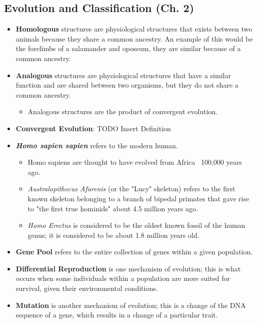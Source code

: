 \documentclass[10pt, landscape]{article}
\begin{document}
\begin{multicols}{2}
		\section{Evolution and Classification (Ch. 2)}
			\begin{itemize}
				\item \textbf{Homologous} structures are physiological structures that exists between two animals because they share a common ancestry. An example of this would be the forelimbs of a salamander and opossum, they are similar because of a common ancestry.
				\item \textbf{Analogous} structures are physiological structures that have a similar function and are shared between two organisms, but they do not share a common ancestry.
				\begin{itemize}
					\item Analogous structures are the product of convergent evolution.
				\end{itemize}
				\item \textbf{Convergent Evolution}: TODO Insert Definition %
				\item \textbf{\textit{Homo sapien sapien}} refers to the modern human.
				\begin{itemize}
					\item Homo sapiens are thought to have evolved from Africa ~100,000 years ago.
					\item \textit{Australopithecus Afarenis} (or the "Lucy" skeleton) refers to the first known skeleton belonging to a branch of bipedal primates that gave rise to "the first true hominids" about 4.5 million years ago.
					\item \textit{Homo Erectus} is considered to be the oldest known fossil of the human genus; it is considered to be about 1.8 million years old. 
				\end{itemize}
				\item \textbf{Gene Pool} refers to the entire collection of genes within a given population.
				\item \textbf{Differential Reproduction} is one mechanism of evolution; this is what occurs when some individuals within a population are more suited for survival, given their environmental conditions. 
				\item \textbf{Mutation} is another mechanism of evolution; this is a change of the DNA sequence of a gene, which results in a change of a particular trait.

\end{itemize}
\end{multicols}
\end{document}
